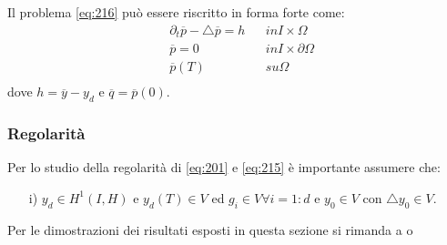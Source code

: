 Il problema \ref{eq:216} può essere riscritto in forma forte come:
\begin{equation}
\begin{aligned}
& {\partial_{t}}\overline{p} -\bigtriangleup\overline{p} = h & & in I{\times}\Omega \\
& \overline{p}=0 & & in I{\times}\partial\Omega \\
& \overline{p}(T) & & su \Omega \\
\label{eq:217}
\end{aligned}
\end{equation}
dove $ h= \overline{y} - y_d$ e $\overline{q}=\overline{p}(0)$.

\subsubsection{Regolarità}
Per lo studio della regolarità di \ref{eq:201} e \ref{eq:215} è importante assumere che:
\begin{itemize}
\item[i)] $y_d \in H^1(I,H)$ e $y_d(T) \in V$ ed $g_i \in V {\forall}i=1:d$ e $y_0 \in V$ con ${\bigtriangleup}y_0 \in V$.
\end{itemize} 
Per le dimostrazioni dei risultati esposti in questa sezione si rimanda a \cite{MAIN} o \cite{MV11}